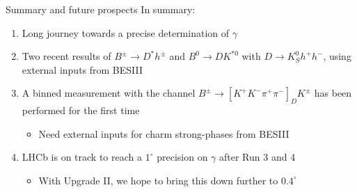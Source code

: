 \documentclass[dvipsnames]{beamer}
\begin{document}
\begin{frame}{Summary and future prospects}
  \vspace{0.0cm}
  {\Large In summary:}
  \vspace{0.3cm}
  \begin{enumerate}
    \setlength\itemsep{1.0em}
    \item{Long journey towards a precise determination of $\gamma$}
    \item{Two recent results of $B^\pm\to D^*h^\pm$ and $B^0\to DK^{*0}$ with $D\to K_S^0h^+h^-$, using external inputs from BESIII}
    \item{A binned measurement with the channel $B^\pm\to[K^+K^-\pi^+\pi^-]_DK^\pm$ has been performed for the first time}
    \begin{itemize}
      \item{Need external inputs for charm strong-phases from BESIII}
    \end{itemize}
    \item{LHCb is on track to reach a $1^\circ$ precision on $\gamma$ after Run 3 and 4}
    \begin{itemize}
      \item{With Upgrade II, we hope to bring this down further to $0.4^\circ$}
    \end{itemize}
  \end{enumerate}
  \vspace{0.4cm}
  \begin{center}
    {\huge \phantom{Thanks for your attention!}}
  \end{center}
\end{frame}
\end{document}
